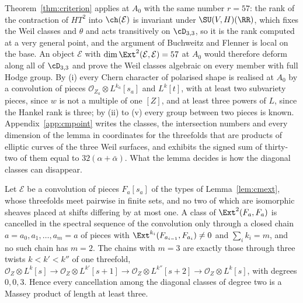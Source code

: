 Theorem~\ref{thm:criterion} applies at $A_{0}$ with the same number $r=57$: the rank of the contraction of $HT^{2}$ into $\ch(\mathcal{E})$ is invariant under $\SU(V,H)(\RR)$, which fixes the Weil classes and $\theta$ and acts transitively on $\cD_{3,3}$, so it is the rank computed at a very general point, and the argument of Buchweitz and Flenner is local on the base. An object $\mathcal{E}$ with $\dim\Ext^{2}(\mathcal{E},\mathcal{E})=57$ at $A_{0}$ would therefore deform along all of $\cD_{3,3}$ and prove the Weil classes algebraic on every member with full Hodge group. By (i) every Chern character of polarised shape is realised at $A_{0}$ by a convolution of pieces $\mathcal{O}_{Z_{a}}\otimes L^{k_{a}}[s_{a}]$ and $L^{k}[t]$, with at least two subvariety pieces, since $w$ is not a multiple of one $[Z]$, and at least three powers of $L$, since the Hankel rank is three; by (ii) to (v) every group between two pieces is known. Appendix~\ref{app:cmpoint} writes the classes, the intersection numbers and every dimension of the lemma in coordinates for the threefolds that are products of elliptic curves of the three Weil surfaces, and exhibits the signed sum of thirty-two of them equal to $32(\alpha+\bar\alpha)$. What the lemma decides is how the diagonal classes can disappear.

\begin{proposition}\label{prop:twostep}
Let $\mathcal{E}$ be a convolution of pieces $F_{a}[s_{a}]$ of the types of Lemma~\ref{lem:cmext}, whose threefolds meet pairwise in finite sets, and no two of which are isomorphic sheaves placed at shifts differing by at most one. A class of $\Ext^{2}(F_{a},F_{a})$ is cancelled in the spectral sequence of the convolution only through a closed chain $a=a_{0},a_{1},\dots,a_{m}=a$ of pieces with $\Ext^{k_{i}}(F_{a_{i-1}},F_{a_{i}})\ne0$ and $\sum_{i}k_{i}=m$, and no such chain has $m=2$. The chains with $m=3$ are exactly those through three twists $k<k'<k''$ of one threefold, $\mathcal{O}_{Z}\otimes L^{k}[s]\to\mathcal{O}_{Z}\otimes L^{k'}[s+1]\to\mathcal{O}_{Z}\otimes L^{k''}[s+2]\to\mathcal{O}_{Z}\otimes L^{k}[s]$, with degrees $0,0,3$. Hence every cancellation among the diagonal classes of degree two is a Massey product of length at least three.
\end{proposition}

